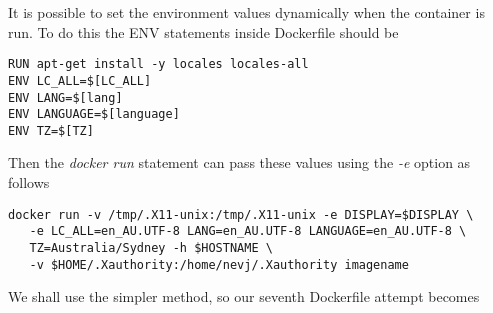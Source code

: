 \documentclass{article}  %
\begin{document}
It is possible to set the environment values dynamically when the container is run. To do this the ENV statements inside Dockerfile should be
\begin{verbatim}
RUN apt-get install -y locales locales-all
ENV LC_ALL=$[LC_ALL]
ENV LANG=$[lang]
ENV LANGUAGE=$[language]
ENV TZ=$[TZ]
\end{verbatim}
Then the {\em docker run} statement can pass these values using the {\em -e} option as follows
\begin{verbatim}
docker run -v /tmp/.X11-unix:/tmp/.X11-unix -e DISPLAY=$DISPLAY \
   -e LC_ALL=en_AU.UTF-8 LANG=en_AU.UTF-8 LANGUAGE=en_AU.UTF-8 \
   TZ=Australia/Sydney -h $HOSTNAME \
   -v $HOME/.Xauthority:/home/nevj/.Xauthority imagename
\end{verbatim}
We shall use the simpler method, so our seventh Dockerfile attempt becomes
\end{document}

